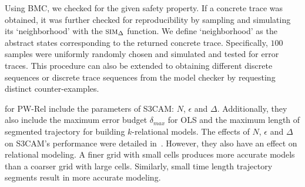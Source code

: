 

Using BMC, we checked for the given safety property. If a concrete
trace was obtained, it was further checked for reproducibility by
sampling and simulating its `neighborhood' with the $\mbox{\sc sim}_\Delta$
function. We define `neighborhood' as the abstract states
corresponding to the returned concrete trace.  Specifically, $100$
samples were uniformly randomly chosen and simulated and tested for
error traces. This procedure can also be extended to obtaining
different discrete sequences or discrete trace sequences from the
model checker by requesting distinct counter-examples.


 for PW-Rel include the parameters of
S3CAM: $N$, $\epsilon$ and $\Delta$. Additionally, they also include
the maximum error budget $\delta_{max}$ for OLS and the maximum length
of segmented trajectory for building $k$-relational models.  The
effects of $N$, $\epsilon$ and $\Delta$ on S3CAM's performance were
detailed in~\cite{zutshi2014multiple}. However, they also have an
effect on relational modeling. A finer grid with small cells produces
more accurate models than a coarser grid with large cells. Similarly,
small time length trajectory segments result in more accurate
modeling.



